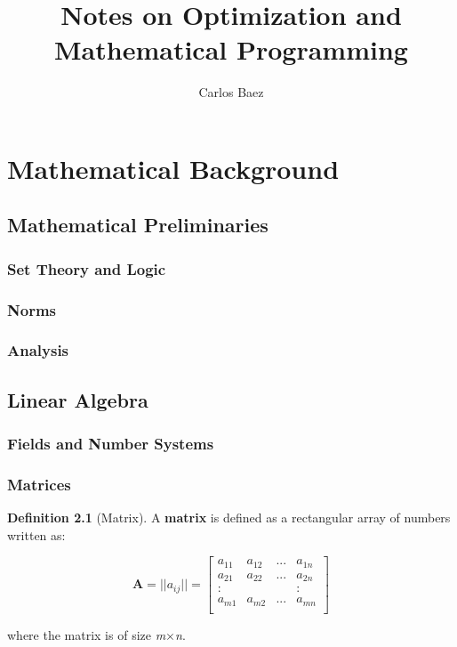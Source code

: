 \documentclass[10pt,legalpaper]{book}
\author{Carlos Baez}
\title{Notes on Optimization and Mathematical Programming}
\theoremstyle{definition}
\newtheorem{defn}{Definition}[chapter]
\theoremstyle{plain}
\theoremstyle{remark}
\begin{document}
\maketitle
\tableofcontents
\part{Mathematical Background}

\chapter{Mathematical Preliminaries}
\section{Set Theory and Logic}
\section{Norms}
\section{Analysis}

\chapter{Linear Algebra}
\section{Fields and Number Systems}
\section{Matrices}
\begin{defn}[Matrix]
A \textbf{matrix} is defined as a rectangular array of numbers written as:
\begin{center}
\begin{equation}
\textbf{A} = ||a_{ij}|| = 
	\left[ 
		\begin{matrix}
			a_{11} & a_{12} & ... & a_{1n}  \\
			a_{21} & a_{22} & ... & a_{2n}  \\
			:      &        &     & :       \\
			a_{m1} & a_{m2} & ... & a_{mn}  \\
		\end{matrix}
	\right]
\end{equation}
\end{center}
where the matrix is of size \textit{m}$\times$\textit{n}.
\end{defn}
\end{document}
